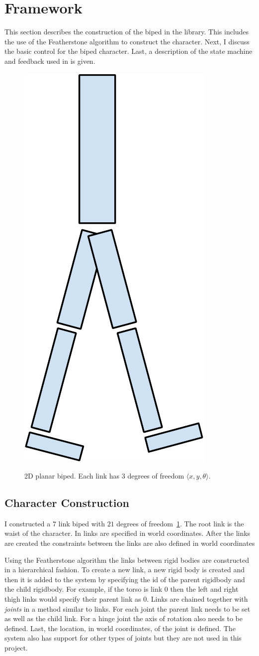 
\section{Framework}
\label{sec:framework}

This section describes the construction of the biped in the \bulletPhysics library. This includes the use of the Featherstone algorithm to construct the character. Next, I discuss the basic control for the biped character. Last, a description of the state machine and feedback used in \SIMBICON is given. 

\begin{figure}[H]
	\includegraphics[width=0.2\linewidth]{../images/2D-Biped-crop.pdf} \\
	\caption{\label{figure:2d-biped} 2D planar biped. Each link has $3$ degrees of freedom $\langle x, y, \theta \rangle$.}
\end{figure}

\subsection{Character Construction}

I constructed a $7$ link biped with $21$ degrees of freedom~\ref{figure:2d-biped}. 
The root link is the waist of the character.
In \bulletPhysics links are specified in world coordinates.
After the links are created the constraints between the links are also defined in world coordinates
 
Using the Featherstone algorithm the links between rigid bodies are constructed in a hierarchical fashion. 
To create a new link, a new rigid body is created and then it is added to the system by specifying the id of the parent rigidbody and the child rigidbody. 
For example, if the torso is link $0$ then the left and right thigh links would specify their parent link as $0$.
Links are chained together with \emph{joints} in a method similar to links.
For each joint the parent link needs to be set as well as the child link.
For a hinge joint the axis of rotation also needs to be defined.
Last, the location, in world coordinates, of the joint is defined.
The system also has support for other types of joints but they are not used in this project.

